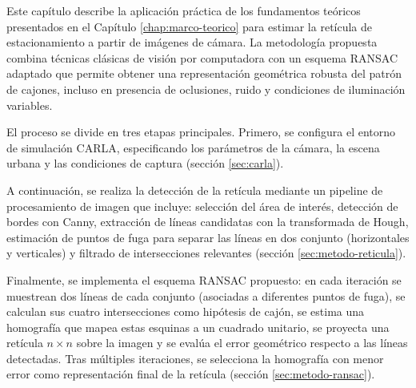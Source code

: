 
Este capítulo describe la aplicación práctica de los fundamentos teóricos presentados en el Capítulo \ref{chap:marco-teorico} para estimar la retícula de estacionamiento a partir de imágenes de cámara. La metodología propuesta combina técnicas clásicas de visión por computadora con un esquema RANSAC adaptado que permite obtener una representación geométrica robusta del patrón de cajones, incluso en presencia de oclusiones, ruido y condiciones de iluminación variables.

El proceso se divide en tres etapas principales. Primero, se configura el entorno de simulación CARLA, especificando los parámetros de la cámara, la escena urbana y las condiciones de captura (sección \ref{sec:carla}).

A continuación, se realiza la detección de la retícula mediante un pipeline de procesamiento de imagen que incluye: selección del área de interés, detección de bordes con Canny, extracción de líneas candidatas con la transformada de Hough, estimación de puntos de fuga para separar las líneas en dos conjunto (horizontales y verticales) y filtrado de intersecciones relevantes (sección \ref{sec:metodo-reticula}).

Finalmente, se implementa el esquema RANSAC propuesto: en cada iteración se muestrean dos líneas de cada conjunto (asociadas a diferentes puntos de fuga), se calculan sus cuatro intersecciones como hipótesis de cajón, se estima una homografía que mapea estas esquinas a un cuadrado unitario, se proyecta una retícula $n\times n$ sobre la imagen y se evalúa el error geométrico respecto a las líneas detectadas. Tras múltiples iteraciones, se selecciona la homografía con menor error como representación final de la retícula (sección \ref{sec:metodo-ransac}).